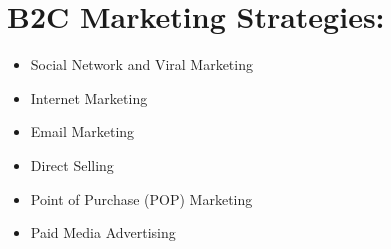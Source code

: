 \documentclass{article}
\begin{document}
\section{B2C Marketing Strategies:}
\begin{itemize}
    \item Social Network and Viral Marketing
    \item Internet Marketing
    \item Email Marketing
    \item Direct Selling
    \item Point of Purchase (POP) Marketing
    \item Paid Media Advertising
\end{itemize}
\end{document}
